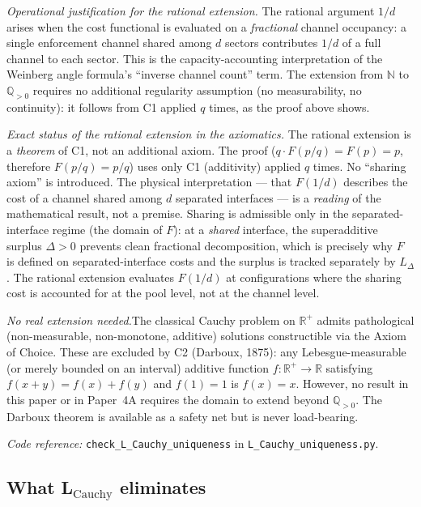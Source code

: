 \documentclass[11pt,a4paper]{article}
\theoremstyle{definition}
\newcommand{\coderef}[2]{\smallskip\noindent\textit{Code reference:} \texttt{#1} in \texttt{#2}.}
\begin{document}
\noindent\textit{Operational justification for the rational extension.}\quad
The rational argument $1/d$ arises when the cost functional is evaluated
on a \emph{fractional} channel occupancy: a single enforcement channel
shared among $d$ sectors contributes $1/d$ of a full channel to each
sector.  This is the capacity-accounting interpretation of the Weinberg
angle formula's ``inverse channel count'' term.  The extension from
$\mathbb{N}$ to $\mathbb{Q}_{>0}$ requires no additional regularity
assumption (no measurability, no continuity): it follows from C1 applied
$q$ times, as the proof above shows.

\smallskip\noindent\textit{Exact status of the rational extension in the axiomatics.}\quad
The rational extension is a \emph{theorem} of C1, not an additional
axiom.  The proof ($q \cdot F(p/q) = F(p) = p$, therefore
$F(p/q) = p/q$) uses only C1 (additivity) applied $q$ times.  No
``sharing axiom'' is introduced.  The physical interpretation ---
that $F(1/d)$ describes the cost of a channel shared among $d$
separated interfaces --- is a \emph{reading} of the mathematical
result, not a premise.  Sharing is admissible only in the
separated-interface regime (the domain of $F$): at a \emph{shared}
interface, the superadditive surplus $\Delta > 0$ prevents clean
fractional decomposition, which is precisely why $F$ is defined on
separated-interface costs and the surplus is tracked separately by
$L_\Delta$.  The rational extension evaluates $F(1/d)$ at
configurations where the sharing cost is accounted for at the pool
level, not at the channel level.

\smallskip\noindent\textit{No real extension needed.}\quad The classical
Cauchy problem on $\mathbb{R}^+$ admits pathological (non-measurable,
non-monotone, additive) solutions constructible via the Axiom of Choice.
These are excluded by C2 (Darboux, 1875): any Lebesgue-measurable (or
merely bounded on an interval) additive function $f: \mathbb{R}^+ \to
\mathbb{R}$ satisfying $f(x+y) = f(x) + f(y)$ and $f(1) = 1$ is
$f(x) = x$.  However, no result in this paper or in Paper~4A requires
the domain to extend beyond $\mathbb{Q}_{>0}$.  The Darboux theorem is
available as a safety net but is never load-bearing.

\coderef{check\_L\_Cauchy\_uniqueness}{L\_Cauchy\_uniqueness.py}


\subsection{What L$_{\mathrm{Cauchy}}$ eliminates}
\label{sec:cauchy_consequences}
\end{document}
